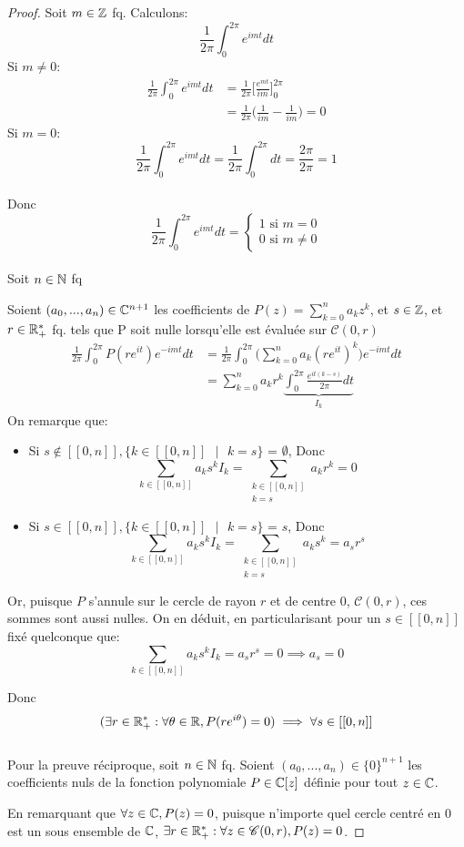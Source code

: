 \documentclass{article}
\begin{document}
\begin{proof}
	Soit $m \in \mathbb Z$ fq. Calculons:
	$$\frac{1}{2 \pi} \int_0^{2\pi}e^{imt}dt$$
	Si $m \neq 0$:
	\begin{align*}
		\frac{1}{2 \pi} \int_0^{2\pi}e^{imt}dt &= \frac{1}{2 \pi} \Big[ \frac{e^{mt}}{im} \Big]_0^{2\pi}\\
		&= \frac{1}{2 \pi} \Big( \frac{1}{im} - \frac{1}{im} \Big) = 0
	\end{align*}
	Si $m = 0$:
	$$
		\frac{1}{2 \pi} \int_0^{2\pi}e^{imt}dt = \frac{1}{2 \pi} \int_0^{2\pi}dt = \frac{2 \pi}{2 \pi} = 1
	$$
	\\
	Donc $$\frac{1}{2 \pi} \int_0^{2\pi}e^{imt}dt = 
	\begin{cases}
		1 \text{ si } m=0\\
		0 \text{ si } m \neq 0
	\end{cases}
	$$
	\\
	Soit $n\in \mathbb N$ fq
	
	Soient $(a_0, ..., a_n) \in \mathbb C^{n+1}$ les coefficients de $P(z) = \sum_{k=0}^n a_k z^k$, et $s\in \mathbb Z$, et $r \in \mathbb R_+^*$ fq. tels que P soit nulle lorsqu'elle est évaluée sur $\mathscr C(0,r)$
	\begin{align*}
		\frac{1}{2 \pi} \int_0^{2\pi} P(re^{it}) e^{-imt}dt &= \frac{1}{2 \pi} \int_0^{2\pi} \bigg (\sum_{k=0}^n a_k (re^{it})^k \bigg) e^{-imt}dt\\
		&= \sum_{k=0}^n a_k r^k \underbrace{\int_0^{2\pi} \frac{e^{it(k-s)}}{2 \pi} dt}_{I_k}
	\end{align*}
	On remarque que:
	\begin{itemize}
	\item Si $s \notin [[0, n]], \{k \in [[0, n]] \text{ }| \text{ } k = s\}$ = $\emptyset$, Donc $$\sum_{k \in [[0, n]]} a_k s^k I_k  = \sum_{\substack{k \in [[0, n]] \\ k = s}} a_k r^k  = 0$$
	\item Si $s \in [[0, n]], \{k \in [[0, n]] \text{ }| \text{ } k = s\}$ = ${s}$, Donc $$\sum_{k \in [[0, n]]} a_k s^k I_k = \sum_{\substack{k \in [[0, n]] \\ k = s}} a_k s^k = a_s r^s \label{1}$$
	\end{itemize}
	Or, puisque $P$ s'annule sur le cercle de rayon $r$ et de centre $0$,  $\mathscr C(0,r)$, ces sommes sont aussi nulles. On en déduit, en particularisant pour un $s \in [[0, n]]$ fixé quelconque que:
	$$
	\sum_{k \in [[0, n]]} a_k s^k I_k = a_sr^s = 0 \implies a_s = 0
	$$
	
	Donc $$
	(\exists r \in \mathbb R_+^* : \forall \theta \in \mathbb R, P(re^{i\theta})=0) \implies \forall s \in [[0, n]]
	$$
	\\
	Pour la preuve réciproque,  soit $n \in \mathbb N$ fq. Soient $(a_0,...,a_n) \in \{ 0 \} ^{n+1}$ les coefficients nuls de la fonction polynomiale $P \in \mathbb C[z]$ définie pour tout $z \in \mathbb C$.
	
	En remarquant que $\forall z \in \mathbb C , P(z) = 0$, puisque n'importe quel cercle centré en 0 est un sous ensemble de $\mathbb C$,  $\exists r \in \mathbb R_+^*: \forall z \in \mathscr C(0, r), P(z) = 0$.
\end{proof}
\end{document}
